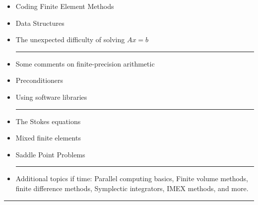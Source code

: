 \documentclass[margin]{res}
\theoremstyle{plain}
\theoremstyle{definition}
\theoremstyle{remark}
\begin{document}
\begin{resume}
{\begin{itemize}
\hrule

\item Coding Finite Element Methods
\item Data Structures
\item The unexpected difficulty of solving $Ax = b$

\hrule

\item Some comments on finite-precision arithmetic 
\item Preconditioners
\item Using software libraries

\hrule

\item The Stokes equations
\item Mixed finite elements
\item Saddle Point Problems

\hrule

\item Additional topics if time: Parallel computing basics, Finite volume methods, finite difference methods,  Symplectic integrators, IMEX methods, and more.
\end{itemize}
}


\hrule

\end{resume}
\end{document}
